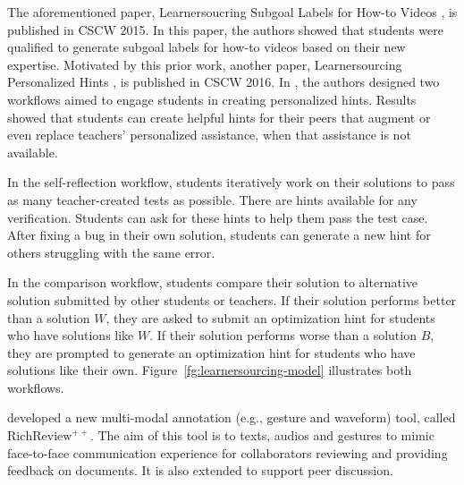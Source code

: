 \documentclass{article}
\begin{document}
The aforementioned paper, Learnersoucring Subgoal Labels for How-to Videos
\cite{Weir2015-hg}, is published in CSCW 2015. In this paper, the
authors showed that students were qualified to generate subgoal labels
for how-to videos based on their new expertise. Motivated by this prior
work, another paper, Learnersourcing Personalized Hints
\cite{Glassman2016-yy}, is published in CSCW 2016. In
\cite{Glassman2016-yy}, the authors designed two workflows aimed to
engage students in creating personalized hints. Results showed that students can create helpful hints for their
peers that augment or even replace teachers’ personalized assistance,
when that assistance is not available.

In the self-reflection workflow, students iteratively work on their
solutions to pass as many teacher-created tests as possible. There are
hints available for any verification. Students can ask for these hints
to help them pass the test case. After fixing a bug in their own
solution, students can generate a new hint for others struggling with
the same error.

In the comparison workflow, students compare their solution to
alternative solution submitted by other students or teachers. If their
solution performs better than a solution $W$, they are asked to submit
an optimization hint for students who have solutions like $W$. If
their solution performs worse than a solution $B$, they are prompted
to generate an optimization hint for students who have solutions like
their own. Figure~\ref{fg:learnersourcing-model} illustrates both workflows.

\cite{Yoon2016-nk} developed a new multi-modal annotation (e.g.,
gesture and waveform) tool, called
$\mathrm{RichReview}^{++}$. The aim of this tool is to texts, audios
and gestures to mimic face-to-face communication experience for
collaborators reviewing and providing feedback on documents. It is
also extended to support peer discussion.


\end{document}
